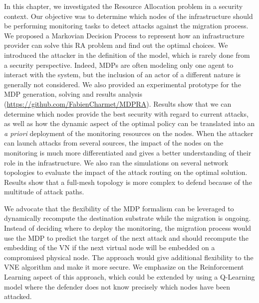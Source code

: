 \label{sec:mdp-conclusion}
In this chapter, we investigated the Resource Allocation problem in a security context. Our objective was to determine which nodes of the infrastructure should be performing monitoring tasks to detect attacks against the migration process.
We proposed a Markovian Decision Process to represent how an infrastructure provider can solve this RA problem and find out the optimal choices.
We introduced the attacker in the definition of the model, which is rarely done from a security perspective. Indeed, MDPs are often modeling only one agent to interact with the system, but the inclusion of an actor of a different nature is generally not considered.
We also provided an experimental prototype for the MDP generation, solving and results analysis  (\url{https://github.com/FabienCharmet/MDPRA}).
Results show that we can determine which nodes provide the best security with regard to current attacks, as well as how the dynamic aspect of the optimal policy can be translated into an \textit{a priori} deployment of the monitoring resources on the nodes.
When the attacker can launch attacks from several sources, the impact of the nodes on the monitoring is much more differentiated and gives a better understanding of their role in the infrastructure.
We also ran the simulations on several network topologies to evaluate the impact of the attack routing on the optimal solution. Results show that a full-mesh topology is more complex to defend because of the multitude of attack paths.

We advocate that the flexibility of the MDP formalism can be leveraged to dynamically recompute the destination substrate while the migration is ongoing.
Instead of deciding where to deploy the monitoring, the migration process would use the MDP to predict the target of the next attack and should recompute the embedding of the VN if the next virtual node will be embedded on a compromised physical node. The approach would give additional flexibility to the VNE algorithm and make it more secure. We emphasize on the Reinforcement Learning aspect of this approach, which could be extended by using a Q-Learning model where the defender does not know precisely which nodes have been attacked.
 

